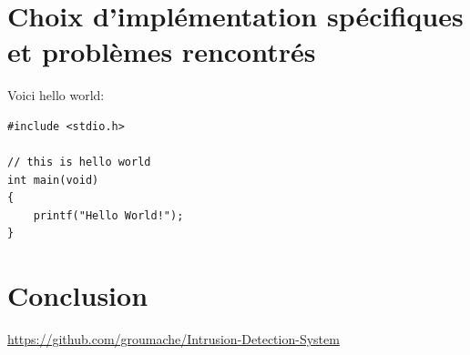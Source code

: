 \documentclass[a4paper]{article}
\begin{document}










\section{Choix d'implémentation spécifiques et problèmes rencontrés}






Voici hello world:

\begin{lstlisting}[style=CStyle]
#include <stdio.h>

// this is hello world
int main(void)
{
    printf("Hello World!"); 
}
\end{lstlisting}










\section{Conclusion}




















\newpage \tableofcontents \listoffigures
\begin{thebibliography}{9}
 {\small \url{https://github.com/groumache/Intrusion-Detection-System}}
\end{thebibliography}
\end{document}
